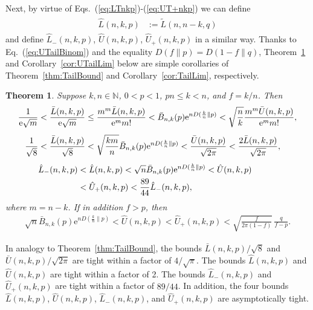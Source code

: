 \documentclass[aop]{imsart}
\theoremstyle{plain}
\newtheorem{theorem}{Theorem}[section]
\theoremstyle{remark}
\newcommand{\rme}{\mathrm{e}}
\newcommand{\bbN}{\mathbb{N}}
\newcommand{\1}{\operatorname{\uppercase\expandafter{\romannumeral1}}}
\newcommand{\2}{\operatorname{\uppercase\expandafter{\romannumeral2}}}
\newcommand{\3}{\operatorname{\uppercase\expandafter{\romannumeral3}}}
\newcommand{\4}{\operatorname{\uppercase\expandafter{\romannumeral4}}}
\newcommand{\5}{\operatorname{\uppercase\expandafter{\romannumeral5}}}
\newcommand{\6}{\operatorname{\uppercase\expandafter{\romannumeral6}}}
\newcommand{\7}{\operatorname{\uppercase\expandafter{\romannumeral7}}}
\newcommand{\8}{\operatorname{\uppercase\expandafter{\romannumeral8}}}
\newcommand{\9}{\operatorname{\uppercase\expandafter{\romannumeral9}}}
\def\eqref#1{\textup{(\ref{#1})}}
\newcommand{\eref}[1]{Eq.~\textup{(\ref{#1})}}
\newcommand{\thref}[1]{Theorem~\ref{#1}}
\newcommand{\crref}[1]{Corollary~\ref{#1}}
\begin{document}
Next, by virtue of Eqs.~\eqref{eq:LTnkp}-\eqref{eq:UT+nkp} we can define
\begin{align}
\begin{split}
\hat{L}(n,k,p)&:=\tilde{L}(n,n-k,q)
\end{split}
\end{align}
and define $\hat{L}_-(n,k,p)$,  $\hat{U}(n,k,p)$,  $\hat{U}_+(n,k,p)$ in a similar way. Thanks to \eref{eq:UTailBinom} and the equality $D(f\|p)=D(1-f\|q)$,  \thref{thm:UTailBound} and \crref{cor:UTailLim} below  are simple corollaries of \thref{thm:TailBound} and \crref{cor:TailLim}, respectively. 
\begin{theorem}\label{thm:UTailBound}
	Suppose  $k,n\in \bbN$,   $0<p<1$,  $pn\leq k<n$, and  $f=k/n$. Then 
	\begin{align}
\frac{1}{\rme \sqrt{m}}& <	\frac{\bar{L}(n,k,p)}{\rme \sqrt{m}} \leq \frac{m^m\bar{L}(n,k,p)}{\rme^{m}m!}
< \bar{B}_{n,k}(p) \rme^{nD(\frac{k}{n}\| p)}< \sqrt{\frac{n}{k}}\frac{m^m\bar{U}(n,k,p)}{\rme^{m}m!},	\label{eq:BnkpLUB1Bar} \\[1ex]
\frac{1}{\sqrt{8}}&< \frac{\bar{L}(n,k,p)}{\sqrt{8}}  < \sqrt{\frac{km}{n}}\bar{B}_{n,k}(p)\rme^{nD(\frac{k}{n}\| p)}	< \frac{\bar{U}(n,k,p)}{\sqrt{2\pi}} 
< \frac{2\bar{L}(n,k,p)}{\sqrt{2\pi }}, \label{eq:BnkpLUB2Bar}\\[1ex]
&\hat{L}_-(n,k,p)< \hat{L}(n,k,p)<	\sqrt{n} \bar{B}_{n,k}(p) \rme^{nD(\frac{k}{n}\| p)}	< \hat{U}(n,k,p) \label{eq:BnkpLUB3Bar}\\
&\hphantom{\hat{L}_-(n,k,p)}< \hat{U}_+(n,k,p)< \frac{89}{44}	\hat{L}_-(n,k,p), \nonumber
\end{align}	
where $m=n-k$.	
If in addition  $f>p$, then 
	\begin{gather}
\sqrt{n} \bar{B}_{n,k}(p) \rme^{nD(\frac{k}{n}\| p)}< \hat{U}(n,k,p)< \hat{U}_+(n,k,p)<	
	\sqrt{\frac{f}{2\pi (1-f)}}\,\frac{q}{f-p}. \label{eq:BnkpLUB4Bar}
	\end{gather}	
\end{theorem}


In analogy to \thref{thm:TailBound}, the  bounds $\bar{L}(n,k,p)/\sqrt{8}$ and $\bar{U}(n,k,p)/\sqrt{2\pi}$   are tight within a factor of $4/\sqrt{\pi}$. The bounds $\hat{L}(n,k,p)$ and  $\hat{U}(n,k,p)$ are tight within  a factor of 2. The  bounds $\hat{L}_-(n,k,p)$ and $\hat{U}_+(n,k,p)$ are tight within  a factor of $89/44$.  In addition, the four bounds $\hat{L}(n,k,p)$, $\hat{U}(n,k,p)$,  $\hat{L}_-(n,k,p)$,  and $\hat{U}_+(n,k,p)$
are asymptotically tight. 
\end{document}

